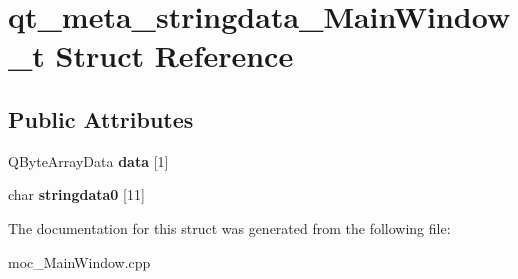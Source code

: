 \hypertarget{structqt__meta__stringdata__MainWindow__t}{}\section{qt\+\_\+meta\+\_\+stringdata\+\_\+\+Main\+Window\+\_\+t Struct Reference}
\label{structqt__meta__stringdata__MainWindow__t}
\subsection*{Public Attributes}
\begin{DoxyCompactItemize}
\item 
Q\+Byte\+Array\+Data {\bfseries data} \mbox{[}1\mbox{]}\hypertarget{structqt__meta__stringdata__MainWindow__t_a0ae2a8bf39f0690707c6a48ca1585d31}{}\label{structqt__meta__stringdata__MainWindow__t_a0ae2a8bf39f0690707c6a48ca1585d31}

\item 
char {\bfseries stringdata0} \mbox{[}11\mbox{]}\hypertarget{structqt__meta__stringdata__MainWindow__t_a9779ce86858769bbae7d2cb0c461d77c}{}\label{structqt__meta__stringdata__MainWindow__t_a9779ce86858769bbae7d2cb0c461d77c}

\end{DoxyCompactItemize}


The documentation for this struct was generated from the following file\+:\begin{DoxyCompactItemize}
\item 
moc\+\_\+\+Main\+Window.\+cpp\end{DoxyCompactItemize}
